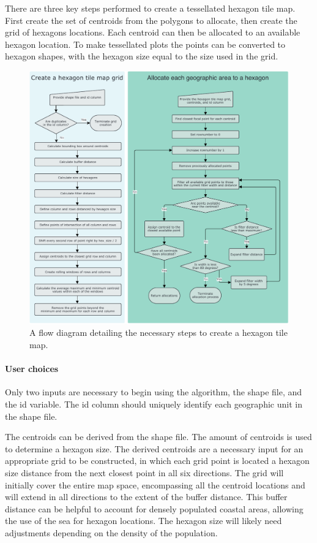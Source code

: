 There are three key steps performed to create a tessellated hexagon tile
map. First create the set of centroids from the polygons to allocate,
then create the grid of hexagons locations. Each centroid can then be
allocated to an available hexagon location. To make tessellated plots
the points can be converted to hexagon shapes, with the hexagon size
equal to the size used in the grid.

\begin{figure}
\includegraphics[width=14cm]{figs/flowchart.pdf}
\caption{\label{fig:sugarbag_flow}A flow diagram detailing the necessary steps to create a hexagon tile map.}
\end{figure}

\hypertarget{user-choices}{%
\paragraph{User choices}\label{user-choices}}

Only two inputs are necessary to begin using the algorithm, the shape
file, and the id variable. The id column should uniquely identify each
geographic unit in the shape file.

The centroids can be derived from the shape file. The amount of
centroids is used to determine a hexagon size. The derived centroids are
a necessary input for an appropriate grid to be constructed, in which
each grid point is located a hexagon size distance from the next closest
point in all six directions. The grid will initially cover the entire
map space, encompassing all the centroid locations and will extend in
all directions to the extent of the buffer distance. This buffer
distance can be helpful to account for densely populated coastal areas,
allowing the use of the sea for hexagon locations. The hexagon size will
likely need adjustments depending on the density of the population.

